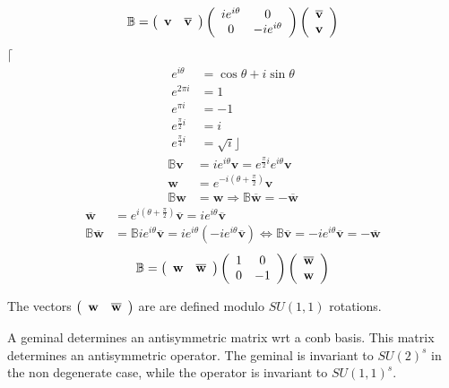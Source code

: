 \documentclass[aps,preprint]{revtex4}%
\begin{document}
\begin{equation}
\mathbb{B}=\left(
\begin{array}
[c]{cc}%
\mathbf{v} & \overline{\mathbf{v}}%
\end{array}
\right)  \left(
\begin{array}
[c]{cc}%
ie^{i\theta} & 0\\
0 & -ie^{i\theta}%
\end{array}
\right)  \left(
\begin{array}
[c]{c}%
\overline{\mathbf{v}}\\
\mathbf{v}%
\end{array}
\right)
\end{equation}
$\lceil$%
\begin{align}
e^{i\theta}  & =\cos\theta+i\sin\theta\\
e^{2\pi i}  & =1\\
e^{\pi i}  & =-1\\
e^{\frac{\pi}{2}i}  & =i\\
e^{\frac{\pi}{4}i}  & =\sqrt{i}\rfloor
\end{align}%
\begin{align}
\mathbb{B}\mathbf{v}  & =ie^{i\theta}\mathbf{v}=e^{\frac{\pi}{2}i}e^{i\theta
}\mathbf{v}\\
\mathbf{w}  & \mathbf{=}e^{-i\left(  \theta+\frac{\pi}{2}\right)  }%
\mathbf{v}\\
\mathbb{B}\mathbf{w}  & =\mathbf{w\Rightarrow}\mathbb{B}\overline{\mathbf{w}%
}=-\overline{\mathbf{w}}%
\end{align}%
\begin{align}
\overline{\mathbf{w}}  & =e^{i\left(  \theta+\frac{\pi}{2}\right)  }%
\overline{\mathbf{v}}=ie^{i\theta}\overline{\mathbf{v}}\\
\mathbb{B}\overline{\mathbf{w}}  & =\mathbb{B}ie^{i\theta}\overline
{\mathbf{v}}=ie^{i\theta}\left(  -ie^{i\theta}\overline{\mathbf{v}}\right)
\Leftrightarrow\mathbb{B}\overline{\mathbf{v}}=-ie^{i\theta}\overline
{\mathbf{v}}=-\overline{\mathbf{w}}%
\end{align}%
\begin{equation}
\mathbb{B}=\left(
\begin{array}
[c]{cc}%
\mathbf{w} & \overline{\mathbf{w}}%
\end{array}
\right)  \left(
\begin{array}
[c]{cc}%
1 & 0\\
0 & -1
\end{array}
\right)  \left(
\begin{array}
[c]{c}%
\overline{\mathbf{w}}\\
\mathbf{w}%
\end{array}
\right)
\end{equation}


The vectors $\left(
\begin{array}
[c]{cc}%
\mathbf{w} & \overline{\mathbf{w}}%
\end{array}
\right)  $ are are defined modulo $SU(1,1)$ rotations. 

A geminal determines an antisymmetric matrix wrt a conb basis. This matrix
determines an antisymmetric operator.  The geminal is invariant to $SU\left(
2\right)  ^{s}$ in the non degenerate case, while the operator is invariant to
$SU\left(  1,1\right)  ^{s}.$
\end{document}
